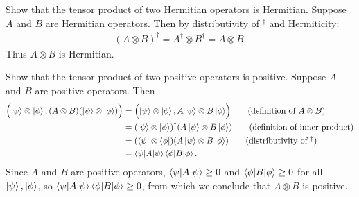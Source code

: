  Show that the tensor product of two Hermitian operators is Hermitian.
\Soln
Suppose $A$ and $B$ are Hermitian operators. Then by distributivity of $^\dagger$ and Hermiticity:
\begin{align*}
(A \otimes B)^\dagger = A^\dagger \otimes B^\dagger = A \otimes B.
\end{align*}
Thus $A \otimes B$ is Hermitian.

 Show that the tensor product of two positive operators is positive.
\Soln
Suppose $A$ and $B$ are positive operators.  Then
\begin{align*}
	\Bigl( \ket{\psi} \otimes \ket{\phi} , (A \otimes B) (\ket{\psi} \otimes \ket{\phi})\Bigr) &= \Bigl(\ket{\psi}\otimes\ket{\phi},  A\ket{\psi}\otimes B\ket{\phi}\Bigr) \tag{definition of $A\otimes B$} \\
	&= (\ket{\psi}\otimes\ket{\phi})^\dagger(A\ket{\psi}\otimes B\ket{\phi}) \tag{definition of inner-product}\\
	&=(\bra{\psi}\otimes\bra{\phi})(A\ket{\psi}\otimes B\ket{\phi}) \tag{distributivity of $^\dagger$} \\
	&= \braket{\psi |A| \psi} \braket{\phi | B | \phi}.
\end{align*}
Since $A$ and $B$ are positive operators, $\braket{\psi |A| \psi} \geq 0$ and $\braket{\phi | B | \phi} \geq 0$ for all $\ket{\psi}, \ket{\phi}$, so $\braket{\psi |A| \psi} \braket{\phi | B | \phi} \geq 0$, from which we conclude that $A \otimes B$ is positive.

